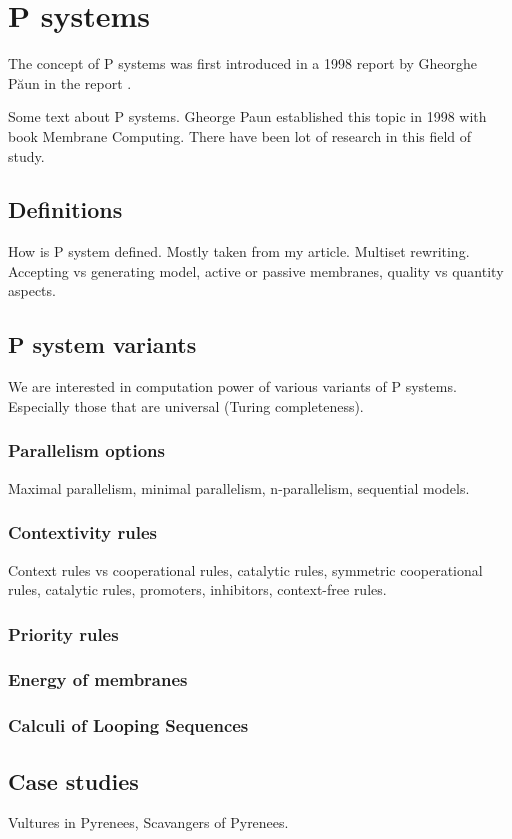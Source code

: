 \documentclass[12pt,oneside,openany,pagenumber=footcenter]{book}
\begin{document}
\chapter{P systems}
The concept of P systems was first introduced in a 1998 report by Gheorghe Păun in the report \cite{Paun:TUCS_208_98:Computing_with:98}.

Some text about P systems. Gheorge Paun established this topic in 1998 with book Membrane Computing. There have been lot of research in this field of study.

\section{Definitions}
How is P system defined. Mostly taken from my article. Multiset rewriting. Accepting vs generating model, active or passive membranes, quality vs quantity aspects.

\section{P system variants}
We are interested in computation power of various variants of P systems. Especially those that are universal (Turing completeness).

\subsection{Parallelism options}
Maximal parallelism, minimal parallelism, n-parallelism, sequential models.

\subsection{Contextivity rules}
Context rules vs cooperational rules, catalytic rules, symmetric cooperational rules, catalytic rules, promoters, inhibitors, context-free rules.

\subsection{Priority rules}
\subsection{Energy of membranes}
\subsection{Calculi of Looping Sequences}

\section{Case studies}
Vultures in Pyrenees, Scavangers of Pyrenees.


\backmatter





\printindex
\end{document}
